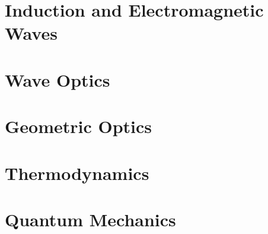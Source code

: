 \documentclass[english,twoside]{labmanual} %
\begin{document}
	


	
	


\part{Induction and Electromagnetic Waves}






\part{Wave Optics}



	
	


\part{Geometric Optics}

	
	

\part{Thermodynamics}

	
	
	
	
	



	

	
	

\part{Quantum Mechanics}
\end{document}
